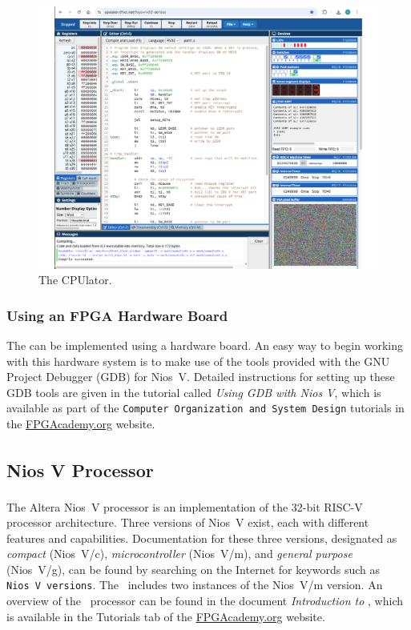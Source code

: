 \begin{figure}[h!]
   \begin{center}
        \includegraphics[scale=.66]{figures/CPUlator.pdf}
   \end{center}
   \caption{The CPUlator.}
	\label{fig:CPUlator}
\end{figure}

\subsubsection {Using an FPGA Hardware Board}

The {\it \systemNameFull} can be implemented using a {\DEBoard} hardware
board.  An easy way to begin working with this hardware system is to make use of the tools
provided with the GNU Project Debugger (GDB) for Nios~V. Detailed instructions for setting up 
these GDB tools are given in the tutorial called {\it Using GDB with Nios V}, which is available
as part of the \texttt{Computer Organization and System Design} tutorials in the 
{\small \href{https://www.fpgacademy.org/tutorials.html} {FPGAcademy.org}} website.

\subsection{Nios\textsuperscript{\textregistered} V Processor}
\label{sec:niosV}
The Altera Nios\textsuperscript{\textregistered}~V processor 
is an implementation of the 32-bit RISC-V processor architecture. Three versions of 
Nios~V exist, each with different features and capabilities.  Documentation for these 
three versions, designated as {\it compact} (Nios~V/c), {\it microcontroller} (Nios~V/m),
and {\it general purpose} (Nios~V/g), can be found by searching on the Internet for keywords 
such as \texttt{Nios~V versions}. The {\it \systemNameFull}~includes two instances of 
the Nios~V/m version. An overview of the \processor~processor can be found in the 
document {\it Introduction to \processor}, which is available in the 
Tutorials tab of the 
{\small \href{https://www.fpgacademy.org/tutorials.html} {FPGAcademy.org}} website.

